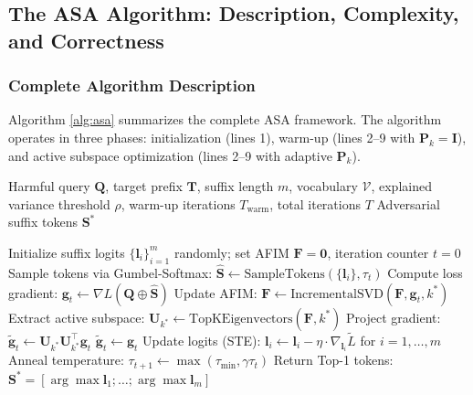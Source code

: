 ﻿\documentclass[lettersize,journal]{IEEEtran}
\begin{document}
\subsection{The ASA Algorithm: Description, Complexity, and Correctness}
\label{sec:algorithm}

\subsubsection{Complete Algorithm Description}
\label{sec:alg_description}

Algorithm \ref{alg:asa} summarizes the complete ASA framework. The algorithm operates in three phases: initialization (lines 1), warm-up (lines 2--9 with $\mathbf{P}_k = \mathbf{I}$), and active subspace optimization (lines 2--9 with adaptive $\mathbf{P}_k$).

\begin{algorithm}[t]
\caption{Active Subspace Attack (ASA)}
\label{alg:asa}
\begin{algorithmic}[1]
\REQUIRE Harmful query $\mathbf{Q}$, target prefix $\mathbf{T}$, suffix length $m$, vocabulary $\mathcal{V}$, explained variance threshold $\rho$, warm-up iterations $T_{\text{warm}}$, total iterations $T$
\ENSURE Adversarial suffix tokens $\mathbf{S}^*$

\STATE Initialize suffix logits $\{\mathbf{l}_i\}_{i=1}^m$ randomly; set AFIM $\mathbf{F} = \mathbf{0}$, iteration counter $t = 0$
{}
    \STATE Sample tokens via Gumbel-Softmax: $\hat{\mathbf{S}} \leftarrow \text{SampleTokens}(\{\mathbf{l}_i\},\tau_t)$
    \STATE Compute loss gradient: $\mathbf{g}_t \leftarrow \nabla L(\mathbf{Q} \oplus \hat{\mathbf{S}})$
        \STATE Update AFIM: $\mathbf{F} \leftarrow \text{IncrementalSVD}(\mathbf{F}, \mathbf{g}_t, k^*)$
        \STATE Extract active subspace: $\mathbf{U}_{k^*} \leftarrow \text{TopKEigenvectors}(\mathbf{F}, k^*)$
        \STATE Project gradient: $\tilde{\mathbf{g}}_t \leftarrow \mathbf{U}_{k^*}\mathbf{U}_{k^*}^\top \mathbf{g}_t$
    \ELSE
        \STATE $\tilde{\mathbf{g}}_t \leftarrow \mathbf{g}_t$ 
    \ENDIF
    \STATE Update logits (STE): $\mathbf{l}_i \leftarrow \mathbf{l}_i - \eta \cdot \nabla_{\mathbf{l}_i} \tilde{L}$ for $i = 1, \dots, m$
    \STATE Anneal temperature: $\tau_{t+1} \leftarrow \max(\tau_{\text{min}}, \gamma \tau_t)$
\ENDFOR
\STATE Return Top-1 tokens: $\mathbf{S}^* = [\arg\max \mathbf{l}_1; \dots; \arg\max \mathbf{l}_m]$
\end{algorithmic}
\end{algorithm}
\end{document}
